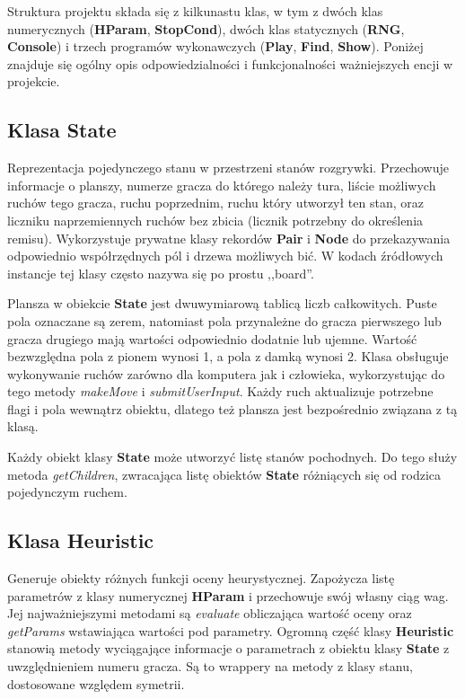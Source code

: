 Struktura projektu składa się z kilkunastu klas, w tym z dwóch klas numerycznych (\textbf{HParam}, \textbf{StopCond}), dwóch klas statycznych (\textbf{RNG}, \textbf{Console}) i trzech programów wykonawczych (\textbf{Play}, \textbf{Find}, \textbf{Show}). Poniżej znajduje się ogólny opis odpowiedzialności i funkcjonalności ważniejszych encji w projekcie.

\subsection{Klasa State}

Reprezentacja pojedynczego stanu w przestrzeni stanów rozgrywki. Przechowuje informacje o planszy, numerze gracza do którego należy tura, liście możliwych ruchów tego gracza, ruchu poprzednim, ruchu który utworzył ten stan, oraz liczniku naprzemiennych ruchów bez zbicia (licznik potrzebny do określenia remisu). Wykorzystuje prywatne klasy rekordów \textbf{Pair} i \textbf{Node} do przekazywania odpowiednio współrzędnych pól i drzewa możliwych bić. W kodach źródłowych instancje tej klasy często nazywa się po prostu ,,board''.

Plansza w obiekcie \textbf{State} jest dwuwymiarową tablicą liczb całkowitych. Puste pola oznaczane są zerem, natomiast pola przynależne do gracza pierwszego lub gracza drugiego mają wartości odpowiednio dodatnie lub ujemne. Wartość bezwzględna pola z pionem wynosi 1, a pola z damką wynosi 2. Klasa obsługuje wykonywanie ruchów zarówno dla komputera jak i człowieka, wykorzystując do tego metody \textit{makeMove} i \textit{submitUserInput}. Każdy ruch aktualizuje potrzebne flagi i pola wewnątrz obiektu, dlatego też plansza jest bezpośrednio związana z tą klasą.

% 


Każdy obiekt klasy \textbf{State} może utworzyć listę stanów pochodnych. Do tego służy metoda \textit{getChildren}, zwracająca listę obiektów \textbf{State} różniących się od rodzica pojedynczym ruchem.

\subsection{Klasa Heuristic}

Generuje obiekty różnych funkcji oceny heurystycznej. Zapożycza listę parametrów z klasy numerycznej \textbf{HParam} i przechowuje swój własny ciąg wag. Jej najważniejszymi metodami są \textit{evaluate} obliczająca wartość oceny oraz \textit{getParams} wstawiająca wartości pod parametry. Ogromną część klasy \textbf{Heuristic} stanowią metody wyciągające informacje o parametrach z obiektu klasy \textbf{State} z uwzględnieniem numeru gracza. Są to wrappery na metody z klasy stanu, dostosowane względem symetrii.


